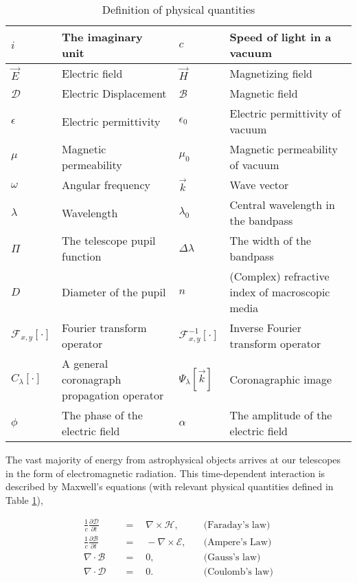 \documentclass[letterpaper]{ar-1col}
\begin{document}
\begin{table}
\caption{Definition of physical quantities}\label{tab1}
\begin{center}
\begin{tabular}{@{}l|l|l|l@{}}
\hline
$i$ & The imaginary unit & $c$ & Speed of light in a vacuum \\\hline
$\vec{E}$ & Electric field & $\vec{H}$ & Magnetizing field \\\hline
$\mathcal{D}$ & Electric Displacement & $\mathcal{B}$ & Magnetic field \\\hline
$\epsilon$ & Electric permittivity & $\epsilon_0$ & Electric permittivity of vacuum \\\hline
$\mu$ & Magnetic permeability & $\mu_0$ & Magnetic permeability of vacuum \\\hline
$\omega$ & Angular frequency & $\vec{k}$ & Wave vector \\\hline
$\lambda$ & Wavelength & $\lambda_0$ & Central wavelength in the bandpass \\\hline
$\Pi$ & The telescope pupil function & $\Delta\lambda$ & The width of the bandpass \\\hline
$D$ & Diameter of the pupil & $n$ & (Complex) refractive index of macroscopic media \\\hline
$\mathcal{F}_{x,y}[\cdot]$ & Fourier transform operator & $\mathcal{F}^{-1}_{x,y}[\cdot]$ & Inverse Fourier transform operator \\\hline
$C_\lambda[\cdot]$ & A general coronagraph propagation operator & $\Psi_\lambda[\vec{k}]$ & Coronagraphic image \\\hline
$\phi$ & The phase of the electric field & $\alpha$ & The amplitude of the electric field \\\hline
\hline
\end{tabular}
\end{center}
\end{table}

The vast majority of energy from astrophysical objects arrives at our telescopes in the form of electromagnetic radiation.
%
This time-dependent interaction is described by Maxwell's equations (with relevant physical quantities defined in Table \ref{tab1}),

\begin{equation}
\begin{aligned}
\frac{1}{c}\frac{\partial\mathcal{D}}{\partial t} \quad & = \quad \nabla\times\mathcal{H},   & \quad \text{(Faraday's law)} \\[5pt]
\frac{1}{c}\frac{\partial\mathcal{B}}{\partial t} \quad & = \quad -\nabla\times\mathcal{E},  & \quad \text{(Ampere's Law)}   \\[5pt]
\nabla\cdot\mathcal{B}                 \quad & = \quad 0,                         & \quad \text{(Gauss's law)}   \\[5pt]
\nabla\cdot\mathcal{D}                 \quad & = \quad 0.                         & \quad \text{(Coulomb's law)}
\end{aligned}
\end{equation}
\end{document}
